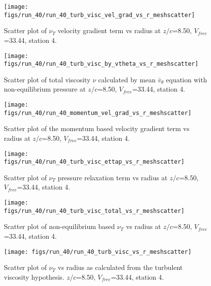 \begin{figure}[H]
\centering
\texttt{[image: figs/run\_40/run\_40\_turb\_visc\_vel\_grad\_vs\_r\_meshscatter]}
\caption{Scatter plot of $\nu_T$ velocity gradient term vs radius at $z/c$=8.50, $V_{free}$=33.44, station 4.}
\end{figure}


\begin{figure}[H]
\centering
\texttt{[image: figs/run\_40/run\_40\_turb\_visc\_by\_vtheta\_vs\_r\_meshscatter]}
\caption{Scatter plot of total viscosity $\nu$ calculated by mean $\bar{v}_{\theta}$ equation with non-equilibrium pressure at $z/c$=8.50, $V_{free}$=33.44, station 4.}
\end{figure}


\begin{figure}[H]
\centering
\texttt{[image: figs/run\_40/run\_40\_momentum\_vel\_grad\_vs\_r\_meshscatter]}
\caption{Scatter plot of the momentum based velocity gradient term vs radius at $z/c$=8.50, $V_{free}$=33.44, station 4.}
\end{figure}


\begin{figure}[H]
\centering
\texttt{[image: figs/run\_40/run\_40\_turb\_visc\_ettap\_vs\_r\_meshscatter]}
\caption{Scatter plot of $\nu_T$ pressure relaxation term vs radius at $z/c$=8.50, $V_{free}$=33.44, station 4.}
\end{figure}


\begin{figure}[H]
\centering
\texttt{[image: figs/run\_40/run\_40\_turb\_visc\_total\_vs\_r\_meshscatter]}
\caption{Scatter plot of non-equilibrium based $\nu_T$ vs radius at $z/c$=8.50, $V_{free}$=33.44, station 4.}
\end{figure}


\begin{figure}[H]
\centering
\texttt{[image: figs/run\_40/run\_40\_turb\_visc\_vs\_r\_meshscatter]}
\caption{Scatter plot of $\nu_T$ vs radius as calculated from the turbulent viscosity hypothesis. $z/c$=8.50, $V_{free}$=33.44, station 4.}
\end{figure}


